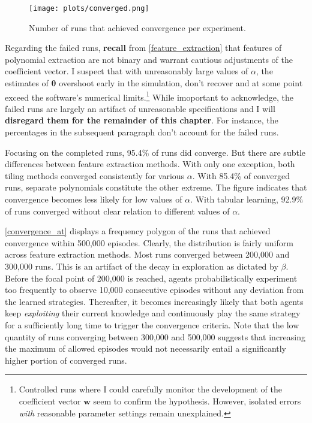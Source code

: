\begin{figure}
	\texttt{[image: plots/converged.png]}
	\caption{Number of runs that achieved convergence per experiment.}
	\label{converged}
\end{figure}

Regarding the failed runs, \textbf{recall} from \autoref{feature_extraction} that features of polynomial extraction are not binary and warrant cautious adjustments of the coefficient vector. I suspect that with unreasonably large values of $\alpha$, the estimates of $\boldsymbol{\theta}$ overshoot early in the simulation, don't recover and at some point exceed the software's numerical limits.\footnote{Controlled runs where I could carefully monitor the development of the coefficient vector $\boldsymbol{w}$ seem to confirm the hypothesis. However, isolated errors \emph{with} reasonable parameter settings remain unexplained.} While imoportant to acknowledge, the failed runs are largely an artifact of unreasonable specifications and I will \textbf{disregard them for the remainder of this chapter}. For instance, the percentages in the subsequent paragraph don't account for the failed runs.

Focusing on the completed runs, 95.4\% of runs did converge. But there are subtle differences between feature extraction methods. With only one exception, both tiling methods converged consistently for various $\alpha$. With 85.4\% of converged runs, separate polynomials constitute the other extreme. The figure indicates that convergence becomes less likely for low values of $\alpha$. With tabular learning, 92.9\% of runs converged without clear relation to different values of $\alpha$.

\autoref{convergence_at} displays a frequency polygon of the runs that achieved convergence within 500,000 episodes. Clearly, the distribution is fairly uniform across feature extraction methods. Most runs converged between 200,000 and 300,000 runs. This is an artifact of the decay in exploration as dictated by $\beta$. Before the focal point of 200,000 is reached, agents probabilistically experiment too frequently to observe 10,000 consecutive episodes without any deviation from the learned strategies. Thereafter, it becomes increasingly likely that both agents keep \emph{exploiting} their current knowledge and continuously play the same strategy for a sufficiently long time to trigger the convergence criteria. Note that the low quantity of runs converging between 300,000 and 500,000 suggests that increasing the maximum of allowed episodes would not necessarily entail a significantly higher portion of converged runs.

